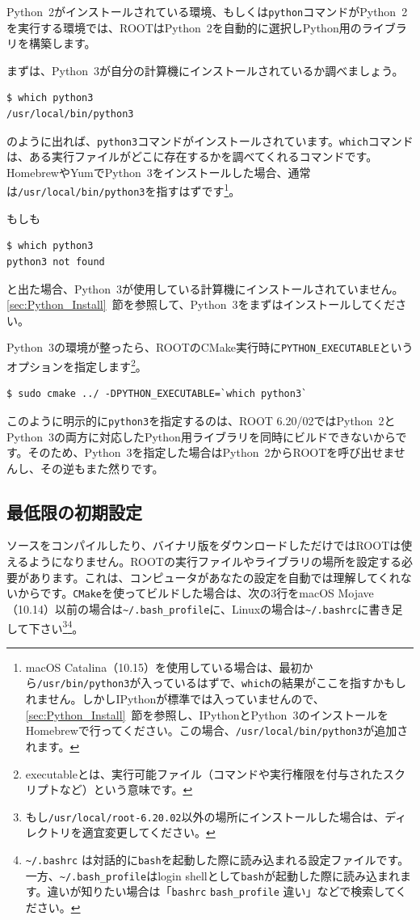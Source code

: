 {Python~2がインストールされている環境、もしくは\texttt{python}コマンドがPython~2を実行する環境では、ROOTはPython~2を自動的に選択しPython用のライブラリを構築します。

まずは、Python~3が自分の計算機にインストールされているか調べましょう。
\begin{lstlisting}
$ which python3
/usr/local/bin/python3
\end{lstlisting}
のように出れば、\texttt{python3}コマンドがインストールされています。\texttt{which}コマンドは、ある実行ファイルがどこに存在するかを調べてくれるコマンドです。HomebrewやYumでPython~3をインストールした場合、通常は\texttt{/usr/local/bin/python3}を指すはずです\footnote{macOS Catalina（10.15）を使用している場合は、最初から\texttt{/usr/bin/python3}が入っているはずで、\texttt{which}の結果がここを指すかもしれません。しかしIPythonが標準では入っていませんので、\ref{sec:Python_Install}~節を参照し、IPythonとPython~3のインストールをHomebrewで行ってください。この場合、\texttt{/usr/local/bin/python3}が追加されます。}。

もしも
\begin{lstlisting}
$ which python3
python3 not found
\end{lstlisting}
と出た場合、Python~3が使用している計算機にインストールされていません。\ref{sec:Python_Install}~節を参照して、Python~3をまずはインストールしてください。

Python~3の環境が整ったら、ROOTのCMake実行時に\texttt{PYTHON\_EXECUTABLE}というオプションを指定します\footnote{executableとは、実行可能ファイル（コマンドや実行権限を付与されたスクリプトなど）という意味です。}。
\begin{lstlisting}
$ sudo cmake ../ -DPYTHON_EXECUTABLE=`which python3`
\end{lstlisting}

このように明示的に\texttt{python3}を指定するのは、ROOT 6.20/02ではPython~2とPython~3の両方に対応したPython用ライブラリを同時にビルドできないからです。そのため、Python~3を指定した場合はPython~2からROOTを呼び出せませんし、その逆もまた然りです。

\subsection{最低限の初期設定}
\label{subsec:settings}
ソースをコンパイルしたり、バイナリ版をダウンロードしただけではROOTは使えるようになりません。ROOTの実行ファイルやライブラリの場所を設定する必要があります。これは、コンピュータがあなたの設定を自動では理解してくれないからです。\texttt{CMake}を使ってビルドした場合は、次の3行をmacOS Mojave（10.14）以前の場合は\texttt{\~{}/.bash\_profile}に、Linuxの場合は\texttt{\~{}/.bashrc}に書き足して下さい\footnote{もし\texttt{/usr/local/root-6.20.02}以外の場所にインストールした場合は、ディレクトリを適宜変更してください。}\footnote{\texttt{\~{}/.bashrc} は対話的に\texttt{bash}を起動した際に読み込まれる設定ファイルです。一方、\texttt{\~{}/.bash\_profile}はlogin shellとして\texttt{bash}が起動した際に読み込まれます。違いが知りたい場合は「\texttt{bashrc} \texttt{bash\_profile} 違い」などで検索してください。}。
\begin{NoFloat}

\end{NoFloat}

}
